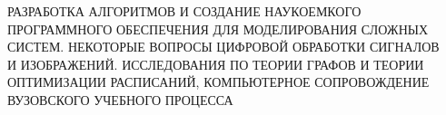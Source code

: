  \begin{center}
 {\large

 РАЗРАБОТКА АЛГОРИТМОВ И СОЗДАНИЕ НАУКОЕМКОГО \\[4pt]
 ПРОГРАММНОГО ОБЕСПЕЧЕНИЯ ДЛЯ МОДЕЛИРОВАНИЯ СЛОЖНЫХ\\[4pt] СИСТЕМ.
 НЕКОТОРЫЕ ВОПРОСЫ ЦИФРОВОЙ ОБРАБОТКИ СИГНАЛОВ\\[4pt] И ИЗОБРАЖЕНИЙ.
 ИССЛЕДОВАНИЯ ПО ТЕОРИИ ГРАФОВ И ТЕОРИИ \\[4pt] ОПТИМИЗАЦИИ РАСПИСАНИЙ,
 КОМПЬЮТЕРНОЕ СОПРОВОЖДЕНИЕ \\[4pt]
 ВУЗОВСКОГО УЧЕБНОГО ПРОЦЕССА
 }
 \\[12pt]
\end{center}
